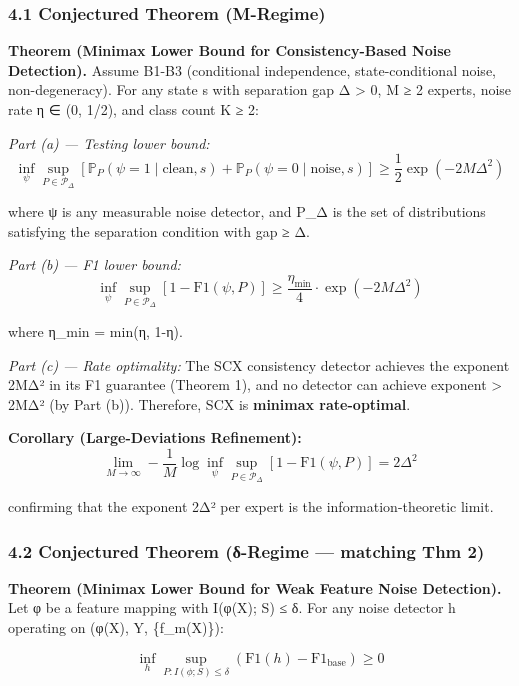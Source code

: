 \documentclass[
  12pt,
]{ctexart}
\begin{document}
\subsubsection{4.1 Conjectured Theorem
(M-Regime)}\label{conjectured-theorem-m-regime}

\textbf{Theorem (Minimax Lower Bound for Consistency-Based Noise
Detection).} Assume B1-B3 (conditional independence, state-conditional
noise, non-degeneracy). For any state s with separation gap Δ
\textgreater{} 0, M ≥ 2 experts, noise rate η ∈ (0, 1/2), and class
count K ≥ 2:

\emph{Part (a) --- Testing lower bound:}
\[\inf_{\psi} \sup_{P \in \mathcal{P}_{\Delta}} \left[ \mathbb{P}_P(\psi=1 \mid \text{clean}, s) + \mathbb{P}_P(\psi=0 \mid \text{noise}, s) \right] \geq \frac{1}{2} \exp\!\left(-2M\Delta^2\right)\]

where ψ is any measurable noise detector, and P\_Δ is the set of
distributions satisfying the separation condition with gap ≥ Δ.

\emph{Part (b) --- F1 lower bound:}
\[\inf_{\psi} \sup_{P \in \mathcal{P}_{\Delta}} \left[1 - \text{F1}(\psi, P)\right] \geq \frac{\eta_{\min}}{4} \cdot \exp\!\left(-2M\Delta^2\right)\]

where η\_min = min(η, 1-η).

\emph{Part (c) --- Rate optimality:} The SCX consistency detector
achieves the exponent 2MΔ² in its F1 guarantee (Theorem 1), and no
detector can achieve exponent \textgreater{} 2MΔ² (by Part (b)).
Therefore, SCX is \textbf{minimax rate-optimal}.

\textbf{Corollary (Large-Deviations Refinement):}
\[\lim_{M \to \infty} -\frac{1}{M} \log \inf_{\psi} \sup_{P \in \mathcal{P}_{\Delta}} \left[1 - \text{F1}(\psi, P)\right] = 2\Delta^2\]

confirming that the exponent 2Δ² per expert is the information-theoretic
limit.

\subsubsection{4.2 Conjectured Theorem (δ-Regime --- matching Thm
2)}\label{conjectured-theorem-ux3b4-regime-matching-thm-2}

\textbf{Theorem (Minimax Lower Bound for Weak Feature Noise Detection).}
Let φ be a feature mapping with I(φ(X); S) ≤ δ. For any noise detector h
operating on (φ(X), Y, \{f\_m(X)\}):

\[\inf_{h} \sup_{P: I(\phi;S) \leq \delta} \left(\text{F1}(h) - \text{F1}_{\text{base}}\right) \geq 0\]
\end{document}
